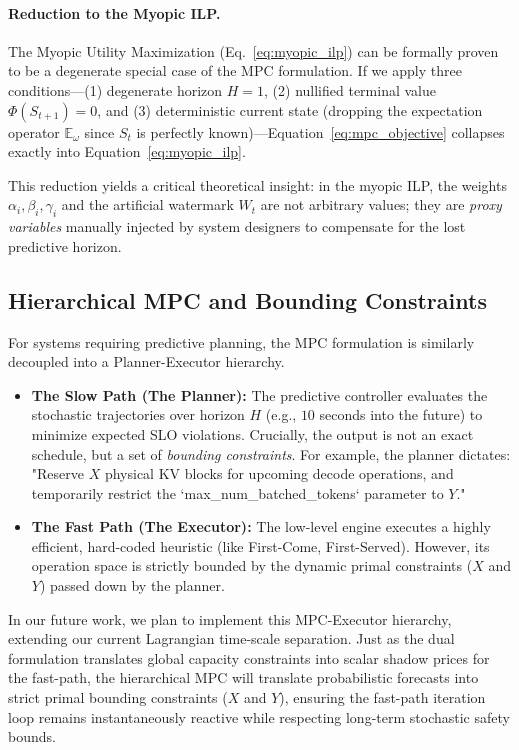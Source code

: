 \documentclass[11pt]{article}
\begin{document}
\paragraph{Reduction to the Myopic ILP.} The Myopic Utility Maximization (Eq.~\ref{eq:myopic_ilp}) can be formally proven to be a degenerate special case of the MPC formulation. If we apply three conditions—(1) degenerate horizon $H = 1$, (2) nullified terminal value $\Phi(S_{t+1}) = 0$, and (3) deterministic current state (dropping the expectation operator $\mathbb{E}_{\omega}$ since $S_t$ is perfectly known)—Equation~\ref{eq:mpc_objective} collapses exactly into Equation~\ref{eq:myopic_ilp}. 

This reduction yields a critical theoretical insight: in the myopic ILP, the weights $\alpha_i, \beta_i, \gamma_i$ and the artificial watermark $W_t$ are not arbitrary values; they are \textit{proxy variables} manually injected by system designers to compensate for the lost predictive horizon.

\subsection{Hierarchical MPC and Bounding Constraints}
\label{subsec:hierarchical_mpc}

For systems requiring predictive planning, the MPC formulation is similarly decoupled into a Planner-Executor hierarchy.

\begin{itemize}
    \item \textbf{The Slow Path (The Planner):} The predictive controller evaluates the stochastic trajectories over horizon $H$ (e.g., $10$ seconds into the future) to minimize expected SLO violations. Crucially, the output is not an exact schedule, but a set of \textit{bounding constraints}. For example, the planner dictates: "Reserve $X$ physical KV blocks for upcoming decode operations, and temporarily restrict the `max\_num\_batched\_tokens` parameter to $Y$."
    \item \textbf{The Fast Path (The Executor):} The low-level engine executes a highly efficient, hard-coded heuristic (like First-Come, First-Served). However, its operation space is strictly bounded by the dynamic primal constraints ($X$ and $Y$) passed down by the planner.
\end{itemize}

In our future work, we plan to implement this MPC-Executor hierarchy, extending our current Lagrangian time-scale separation. Just as the dual formulation translates global capacity constraints into scalar shadow prices for the fast-path, the hierarchical MPC will translate probabilistic forecasts into strict primal bounding constraints ($X$ and $Y$), ensuring the fast-path iteration loop remains instantaneously reactive while respecting long-term stochastic safety bounds.
\end{document}
